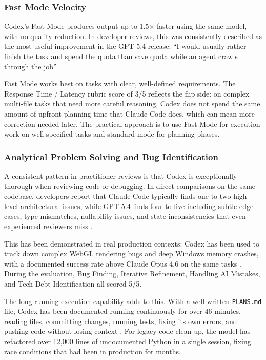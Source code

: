 \documentclass[conference]{IEEEtran}
\begin{document}
\subsubsection{Fast Mode Velocity}
Codex's Fast Mode produces output up to 1.5$\times$ faster using the same model, with no quality reduction. In developer reviews, this was consistently described as the most useful improvement in the GPT-5.4 release: ``I would usually rather finish the task and spend the quota than save quota while an agent crawls through the job'' \cite{holter2026}.

Fast Mode works best on tasks with clear, well-defined requirements. The Response Time / Latency rubric score of 3/5 reflects the flip side: on complex multi-file tasks that need more careful reasoning, Codex does not spend the same amount of upfront planning time that Claude Code does, which can mean more correction needed later. The practical approach is to use Fast Mode for execution work on well-specified tasks and standard mode for planning phases.

\subsubsection{Analytical Problem Solving and Bug Identification}
A consistent pattern in practitioner reviews is that Codex is exceptionally thorough when reviewing code or debugging. In direct comparisons on the same codebase, developers report that Claude Code typically finds one to two high-level architectural issues, while GPT-5.4 finds four to five including subtle edge cases, type mismatches, nullability issues, and state inconsistencies that even experienced reviewers miss \cite{chandler2026}.

This has been demonstrated in real production contexts: Codex has been used to track down complex WebGL rendering bugs and deep Windows memory crashes, with a documented success rate above Claude Opus 4.6 on the same tasks \cite{chandler2026}. During the evaluation, Bug Finding, Iterative Refinement, Handling AI Mistakes, and Tech Debt Identification all scored 5/5.

The long-running execution capability adds to this. With a well-written \texttt{PLANS.md} file, Codex has been documented running continuously for over 46 minutes, reading files, committing changes, running tests, fixing its own errors, and pushing code without losing context \cite{chandler2026}. For legacy code clean-up, the model has refactored over 12,000 lines of undocumented Python in a single session, fixing race conditions that had been in production for months.
\end{document}
